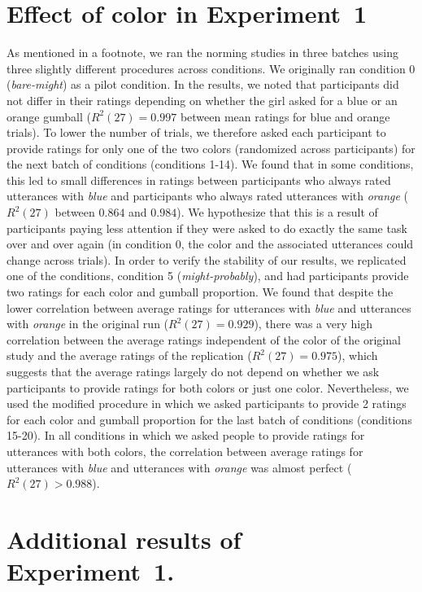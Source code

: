 
\chapter{Effect of color in Experiment~1}



As mentioned in a footnote, we ran the norming studies in three batches using three slightly different procedures across conditions. We originally ran condition 0 (\emph{bare-might}) as a pilot condition. In the results, we noted that participants did not differ in their ratings depending on whether the girl asked for a blue or an orange gumball ($R^2(27)=0.997$ between mean ratings for blue and orange trials). To lower the number of trials, we therefore asked each participant to provide ratings for only one of the two colors (randomized across participants) for the next batch of conditions (conditions 1-14). We found that in some conditions, this led to small differences in ratings between participants who always rated utterances with \emph{blue} and participants who always rated utterances with \textit{orange} ($R^2(27)$ between $0.864$ and $0.984$). We hypothesize that this is a result of participants paying less attention if they were asked to do exactly the same task over and over again (in condition 0, the color and the associated utterances could change across trials). In order to verify the stability of our results, we replicated one of the conditions, condition 5 (\emph{might-probably}), and had participants provide two ratings for each color and gumball proportion. We found that despite the lower correlation between average ratings for utterances with \emph{blue} and utterances with \emph{orange} in the original run ($R^2(27)=0.929$), there was a very high correlation between the average ratings independent of the color of the original study and the average ratings of the replication ($R^2(27)=0.975$), which suggests that the average ratings largely do not depend on whether we ask participants to provide ratings for both colors or just one color. Nevertheless, we used the modified procedure in which we asked participants to provide 2 ratings for each color and gumball proportion for the last batch of conditions (conditions 15-20). In all conditions in which we asked people to provide ratings for utterances with both colors, the correlation between average ratings for utterances with \emph{blue} and utterances with \emph{orange} was almost perfect ($R^2(27)>0.988$).



\chapter{Additional results of Experiment~1.}


